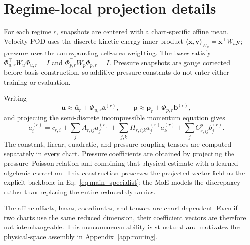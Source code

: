 \section{Regime-local projection details}
\label{app:rom}

For each regime $r$, snapshots are centered with a chart-specific affine mean. Velocity POD uses the discrete kinetic-energy inner product $\langle\bm x,\bm y\rangle_{W_u}=\bm x^\top W_u\bm y$; pressure uses the corresponding cell-area weighting. The bases satisfy $\Phi_{u,r}^\top W_u\Phi_{u,r}=I$ and $\Phi_{p,r}^\top W_p\Phi_{p,r}=I$. Pressure snapshots are gauge corrected before basis construction, so additive pressure constants do not enter either training or evaluation.

Writing
\begin{equation}
  \bm u\approx\bar{\bm u}_r+\Phi_{u,r}\bm a^{(r)},\qquad
  \bm p\approx\bar{\bm p}_r+\Phi_{p,r}\bm b^{(r)},
\end{equation}
and projecting the semi-discrete incompressible momentum equation gives
\begin{equation}
  \dot a_i^{(r)}=c_{r,i}+\sum_j A_{r,ij}a_j^{(r)}
  +\sum_{j,k}H_{r,ijk}a_j^{(r)}a_k^{(r)}
  +\sum_j C^p_{r,ij}b_j^{(r)}.
\end{equation}
The constant, linear, quadratic, and pressure-coupling tensors are computed separately in every chart. Pressure coefficients are obtained by projecting the pressure--Poisson relation and combining that physical estimate with a learned algebraic correction. This construction preserves the projected vector field as the explicit backbone in Eq.~\eqref{eq:main_specialist}; the MoE models the discrepancy rather than replacing the entire reduced dynamics.

The affine offsets, bases, coordinates, and tensors are chart dependent. Even if two charts use the same reduced dimension, their coefficient vectors are therefore not interchangeable. This noncommensurability is structural and motivates the physical-space assembly in Appendix~\ref{app:routing}.
